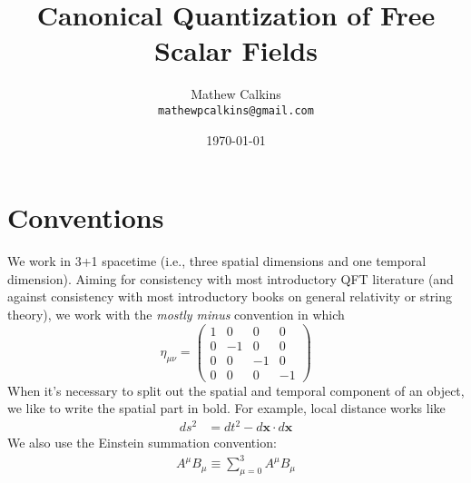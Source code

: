 \documentclass[12 pt]{article}
\newcommand{\B}[1]{\mathbf{#1}}
\numberwithin{equation}{section}
\begin{document}
\title{Canonical Quantization of Free Scalar Fields}
\author{Mathew Calkins\\
  \texttt{mathewpcalkins@gmail.com}}

\date{\today}

\maketitle








\tableofcontents

\section{Conventions}
We work in 3+1 spacetime (i.e., three spatial dimensions and one temporal dimension). Aiming for consistency with most introductory QFT literature (and against consistency with most introductory books on general relativity or string theory), we work with the \textit{mostly minus} convention in which \begin{equation*}
    \eta_{\mu \nu} = \begin{pmatrix}
    1 & 0 & 0 & 0 \\
    0 & -1 & 0 & 0 \\
    0 & 0 & -1 & 0 \\
    0 & 0 & 0 & -1
    \end{pmatrix}
\end{equation*}
When it's necessary to split out the spatial and temporal component of an object, we like to write the spatial part in bold. For example, local distance works like \begin{align*}
    ds^2 & = dt^2 - d\B{x} \cdot d\B{x}
\end{align*}
We also use the Einstein summation convention: \begin{align*}
A^\mu B_\mu \equiv \sum_{\mu = 0} ^3 A^\mu B_\mu
\end{align*}
\end{document}

